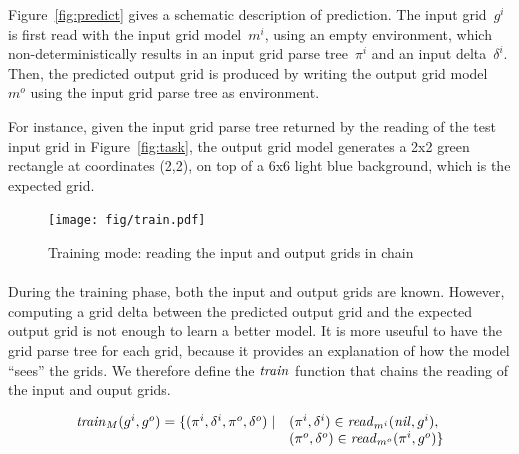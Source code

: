 \documentclass[a4paper]{llncs}
\newcommand{\HIDE}[1]{}
\begin{document}
Figure~\ref{fig:predict} gives a schematic description of
prediction. The input grid~$g^i$ is first read with the input grid
model~$m^i$, using an empty environment, which non-deterministically
results in an input grid parse tree~$\pi^i$ and an input
delta~$\delta^i$. Then, the predicted output grid is produced by
writing the output grid model~$m^o$ using the input grid parse tree as
environment.

For instance, given the input grid parse tree returned by the reading
of the test input grid in Figure~\ref{fig:task}, the output grid model
generates a 2x2 green rectangle at coordinates (2,2), on top of a 6x6
light blue background, which is the expected grid.

\begin{figure}[t]
  \centering
  \texttt{[image: fig/train.pdf]}
  \caption{Training mode: reading the input and output grids in chain}
  \label{fig:train}
\end{figure}

\paragraph{}
During the training phase, both the input and output grids are
known. However, computing a grid delta between the predicted output
grid and the expected output grid is not enough to learn a better
model. It is more useuful to have the grid parse tree for each grid,
because it provides an explanation of how the model ``sees'' the
grids. We therefore define the ${\it train}$ function that chains the
reading of the input and ouput grids.

\HIDE{ On output grids~$y_k$, we use parsing rather than
  generating. This is explained by the fact that description lengths
  are used at the learning stage rather than at the application
  stage. During learning, output models are incomplete, and still
  require some parameters and delta to generate the output
  grid~$y_k$. However, this output grid is available during learning
  (for train examples), and using parsing enables to find which
  parameters and delta are required. The objective of learning is to
  make those output parameters and delta become empty. Knowing what
  are the required parameters and delta can help the learner improve
  the model in this direction.}


\[\begin{array}{rl}
    {\it train}_M(g^i,g^o) = \{ (\pi^i,\delta^i,\pi^o,\delta^o) \mid & (\pi^i,\delta^i) \in {\it read}_{m^i}({\it nil},g^i),\\
                                                                     & (\pi^o,\delta^o) \in {\it read}_{m^o}(\pi^i,g^o) \}
  \end{array}\]
\end{document}
